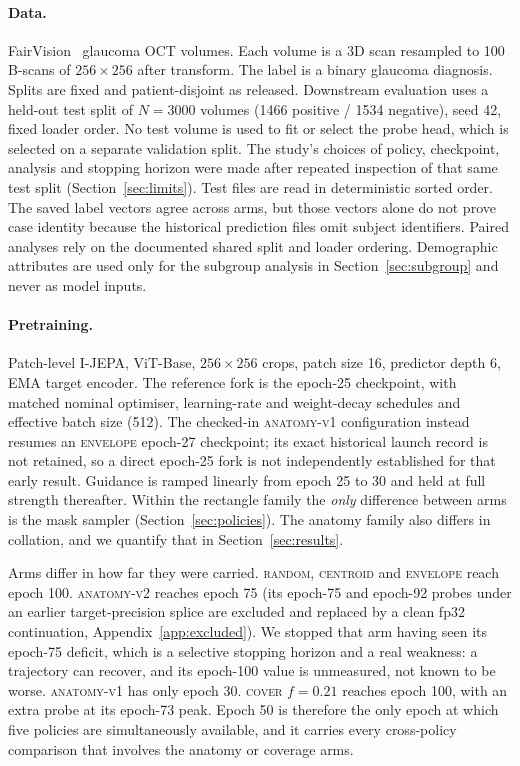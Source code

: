 \documentclass{article}
\newcommand{\ArmBest}{\textsc{centroid}}
\begin{document}
\paragraph{Data.} FairVision~\citep{luo2024fairvision} glaucoma OCT volumes.
Each volume is a 3D scan resampled to 100 B-scans of $256{\times}256$ after
transform. The label is a binary glaucoma diagnosis. Splits are fixed and
patient-disjoint as released. Downstream evaluation uses a held-out test split of
$N{=}3000$ volumes (1466 positive / 1534 negative), seed 42, fixed loader order.
No test volume is used to fit or select the probe head, which is selected on a
separate validation split. The study's choices of policy, checkpoint, analysis
and stopping horizon were made after repeated inspection of that same test split
(Section~\ref{sec:limits}). Test files are read in deterministic sorted order.
The saved label vectors agree across arms, but those vectors alone do not prove
case identity because the historical prediction files omit subject identifiers.
Paired analyses rely on the documented shared split and loader ordering.
Demographic attributes are used only for the subgroup
analysis in Section~\ref{sec:subgroup} and never as model inputs.

\paragraph{Pretraining.} Patch-level I-JEPA, ViT-Base, $256{\times}256$ crops,
patch size 16, predictor depth 6, EMA target encoder. The reference fork is the
epoch-25 checkpoint, with matched nominal optimiser, learning-rate and
weight-decay schedules and effective batch size (512).
The checked-in \textsc{anatomy-v1} configuration instead resumes an
\textsc{envelope} epoch-27 checkpoint; its exact historical launch record is
not retained, so a direct epoch-25 fork is not independently established for
that early result. Guidance is ramped linearly from epoch 25 to 30 and held at full strength
thereafter. Within the rectangle family the \emph{only} difference between arms
is the mask sampler (Section~\ref{sec:policies}). The anatomy family
also differs in collation, and
we quantify that in Section~\ref{sec:results}.

Arms differ in how far they were carried.
\textsc{random}, \ArmBest{} and \textsc{envelope} reach epoch 100.
\textsc{anatomy-v2} reaches epoch 75 (its epoch-75 and epoch-92 probes under an
earlier target-precision splice are excluded and replaced by a clean fp32
continuation, Appendix~\ref{app:excluded}). We stopped that arm having seen its
epoch-75 deficit, which is a selective stopping horizon and a real weakness:
a trajectory can recover, and its epoch-100 value is unmeasured, not known to be
worse.
\textsc{anatomy-v1} has only epoch 30. \textsc{cover} $f{=}0.21$ reaches epoch
100, with an extra probe at its epoch-73 peak. Epoch 50 is therefore the only
epoch at which
five policies are simultaneously available, and it carries every cross-policy
comparison that involves the anatomy or coverage arms.
\end{document}
